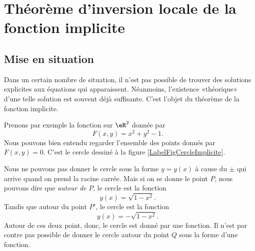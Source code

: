 
					\section{Théorème d'inversion locale de la fonction implicite}

\subsection{Mise en situation}

Dans un certain nombre de situation, il n'est pas possible de trouver des solutions explicites aux équations qui apparaissent. Néanmoins, l'existence «théorique» d'une telle solution est souvent déjà suffisante. C'est l'objet du théorème de la fonction implicite.

Prenons par exemple la fonction sur $\eR^2$ donnée par 
\begin{equation}
	F(x,y)=x^2+y^2-1.
\end{equation}
Nous pouvons bien entendu regarder l'ensemble des points donnés par $F(x,y)=0$. C'est le cercle dessiné à la figure \ref{LabelFigCercleImplicite}.
\newcommand{\CaptionFigCercleImplicite}{Un cercle pour montrer l'intérêt de la fonction implicite. Si on donne \( x\), nous ne pouvons pas savoir si nous parlons de \( P\) ou de \( P'\).}


%

Nous ne pouvons pas donner le cercle sous la forme $y=y(x)$ à cause du $\pm$ qui arrive quand on prend la racine carrée. Mais si on se donne le point $P$, nous pouvons dire que \emph{autour de $P$}, le cercle est la fonction
\begin{equation}
	y(x)=\sqrt{1-x^2}.
\end{equation}
Tandis que autour du point $P'$, le cercle est la fonction
\begin{equation}
	y(x)=-\sqrt{1-x^2}.
\end{equation}
Autour de ces deux point, donc, le cercle est donné par une fonction. Il n'est par contre pas possible de donner le cercle autour du point $Q$ sous la forme d'une fonction.

